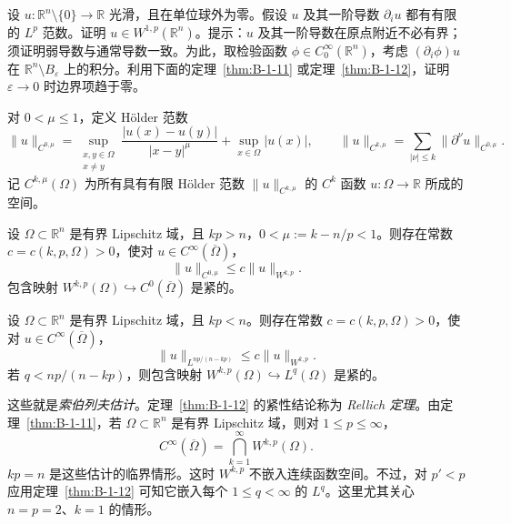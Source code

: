 \begin{exercise}\label{ex:B-1-10}
设 $u:\mathbb R^n\setminus\{0\}\to\mathbb R$ 光滑，且在单位球外为零。假设 $u$ 及其一阶导数 $\partial_i u$ 都有有限的 $L^p$ 范数。证明 $u\in W^{1,p}(\mathbb R^n)$。提示：$u$ 及其一阶导数在原点附近不必有界；须证明弱导数与通常导数一致。为此，取检验函数 $\phi\in C_0^\infty(\mathbb R^n)$，考虑 $(\partial_i\phi)u$ 在 $\mathbb R^n\setminus B_\varepsilon$ 上的积分。利用下面的定理~\ref{thm:B-1-11} 或定理~\ref{thm:B-1-12}，证明 $\varepsilon\to0$ 时边界项趋于零。
\end{exercise}

对 $0<\mu\le1$，定义 Hölder 范数
\[
\|u\|_{C^{0,\mu}}=\sup_{\substack{x,y\in\Omega\\x\ne y}}\frac{|u(x)-u(y)|}{|x-y|^\mu}+\sup_{x\in\Omega}|u(x)|,
\qquad
\|u\|_{C^{k,\mu}}=\sum_{|\nu|\le k}\|\partial^\nu u\|_{C^{0,\mu}}.
\]
记 $C^{k,\mu}(\Omega)$ 为所有具有有限 Hölder 范数 $\|u\|_{C^{k,\mu}}$ 的 $C^k$ 函数 $u:\Omega\to\mathbb R$ 所成的空间。

\begin{theorem}\label{thm:B-1-11}
设 $\Omega\subset\mathbb R^n$ 是有界 Lipschitz 域，且 $kp>n$，$0<\mu:=k-n/p<1$。则存在常数 $c=c(k,p,\Omega)>0$，使对 $u\in C^\infty(\overline\Omega)$，
\[
\|u\|_{C^{0,\mu}}\le c\|u\|_{W^{k,p}}.
\]
包含映射 $W^{k,p}(\Omega)\hookrightarrow C^0(\overline\Omega)$ 是紧的。
\end{theorem}

\begin{theorem}\label{thm:B-1-12}
设 $\Omega\subset\mathbb R^n$ 是有界 Lipschitz 域，且 $kp<n$。则存在常数 $c=c(k,p,\Omega)>0$，使对 $u\in C^\infty(\overline\Omega)$，
\[
\|u\|_{L^{np/(n-kp)}}\le c\|u\|_{W^{k,p}}.
\]
若 $q<np/(n-kp)$，则包含映射 $W^{k,p}(\Omega)\hookrightarrow L^q(\Omega)$ 是紧的。
\end{theorem}

这些就是\emph{索伯列夫估计}。定理~\ref{thm:B-1-12} 的紧性结论称为
\emph{Rellich 定理}。由定理~\ref{thm:B-1-11}，若
$\Omega\subset\mathbb R^n$ 是有界 Lipschitz 域，则对 $1\le p\le\infty$，
\[
C^\infty(\overline\Omega)=\bigcap_{k=1}^\infty W^{k,p}(\Omega).
\]
$kp=n$ 是这些估计的临界情形。这时 $W^{k,p}$ 不嵌入连续函数空间。不过，对 $p'<p$ 应用定理~\ref{thm:B-1-12} 可知它嵌入每个 $1\le q<\infty$ 的 $L^q$。这里尤其关心 $n=p=2$、$k=1$ 的情形。


